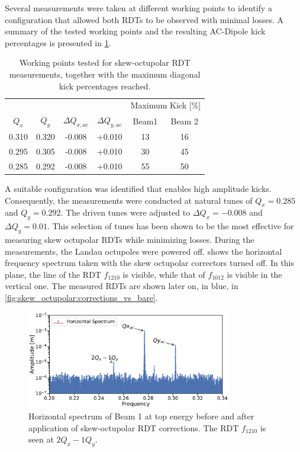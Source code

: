 Several measurements were taken at different working points to identify a configuration that allowed
both RDTs to be observed with minimal losses. A summary of the tested working points and the
resulting AC-Dipole kick percentages is presented in \cref{tab:skew_octupolar:working_points_acd}.

\begin{table}[!htb]
    \centering
    \begin{tabular}{cccccc}
      \hline
      &&&&\multicolumn{2}{c}{Maximum Kick [\%]} \\
      \cline{5-6}
      $Q_x$ & $Q_y$ & $\Delta Q_{x,ac}$ & $\Delta Q_{y,ac}$ & Beam1 & Beam 2 \\
      \hline
      0.310 & 0.320 &-0.008 & +0.010 & 13 & 16 \\
      0.295 & 0.305 &-0.008 & +0.010 & 30 & 45 \\
      0.285 & 0.292 &-0.008 & +0.010 & 55 & 50 \\
      \hline
    \end{tabular}
    \caption{Working points tested for skew-octupolar RDT measurements, together with the maximum
    diagonal kick percentages reached.}
    \label{tab:skew_octupolar:working_points_acd}
\end{table}


A suitable configuration was identified that enables high amplitude kicks. Consequently, the
measurements were conducted at natural tunes of $Q_x = 0.285$ and $Q_y = 0.292$. The driven
tunes were adjusted to $\Delta Q_x = -0.008$ and $\Delta Q_y = 0.01$. This selection of tunes
has been shown to be the most effective for measuring skew octupolar RDTs while minimizing losses.
During the measurements, the Landau octupoles were powered off.
 shows the horizontal frequency spectrum taken
with the skew octupolar correctors turned off. In this plane, the line of the RDT $f_{1210}$ is
visible, while that of $f_{1012}$ is visible in the vertical one. The measured RDTs are shown later
on, in blue, in \cref{fig:skew_octupolar:corrections_vs_bare}.

\begin{figure}[!htb]
    \centering
    \includegraphics[width=0.8\textwidth]{./images/spectrum_a4_top_energy.pdf}
    \caption{Horizontal spectrum of Beam 1 at top energy before and after application of
    skew-octupolar RDT corrections. The RDT $f_{1210}$ is seen at $2Q_x - 1Q_y$.}
    \label{fig:skew_octupolar:spectrum_a4_top_energy}
\end{figure}




